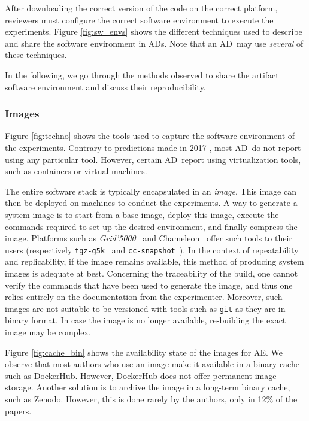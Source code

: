 \documentclass[sigconf,natbib=false]{acmart}
\newcommand{\grid}{\emph{Grid'5000}}
\newcommand{\ad}{AD}
\newcommand{\aeval}{AE}
\newcommand{\fmc}[1]{{\color{magenta} #1}} %
\begin{document}
After downloading the correct version of the code on the correct platform, reviewers must configure the correct software environment to execute the experiments.
Figure \ref{fig:sw_envs} shows the different techniques used to describe and share the software environment in \ad s.
Note that an \ad\ may use \emph{several} of these techniques.

In the following, we go through the methods observed to share the artifact software environment and discuss their reproducibility.

\subsubsection{Images}\label{sec:sop:sw:images}

Figure \ref{fig:techno} shows the tools used to capture the software environment of the experiments.
Contrary to predictions made in 2017 \cite{silver2017software}, most \ad\ do not report using any particular tool.
However, certain \ad\ report using virtualization tools, such as containers or virtual machines.

The entire software stack is typically encapsulated in an \emph{image}.
This image can then be deployed on machines to conduct the experiments.
A way to generate a system image is to start from a base image, deploy this image, execute the commands required to set up the desired environment, and finally compress the image.
Platforms such as \grid\ \cite{grid5000} and Chameleon\ \cite{chameleon} offer such tools to their users (respectively \texttt{tgz-g5k}\ \cite{tgz-g5k} and \texttt{cc-snapshot}\ \cite{cc-snapshot}).
In the context of repeatability and replicability, if the image remains available, this method of producing system images is adequate at best.
Concerning the traceability of the build, one cannot verify the commands that have been used to generate the image, and thus one relies entirely on the documentation from the experimenter.
Moreover, such images are not suitable to be versioned with tools such as \texttt{git} as they are in binary format.
In case the image is no longer available, re-building the exact image may be complex.

Figure \ref{fig:cache_bin} shows the availability state of the images for \aeval.
We observe that most authors who use an image make it available in a binary cache such as DockerHub. 
However, DockerHub does not offer permanent image storage.
Another solution is to archive the image in a long-term binary cache, such as Zenodo.
However, this is done rarely by the authors, only in 12\% of the papers.
\end{document}
